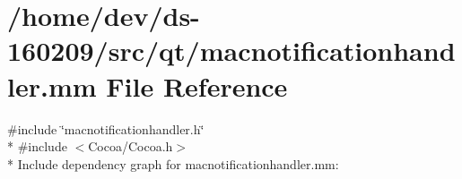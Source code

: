 \hypertarget{macnotificationhandler_8mm}{}\section{/home/dev/ds-\/160209/src/qt/macnotificationhandler.mm File Reference}
\label{macnotificationhandler_8mm}
{\ttfamily \#include \char`\"{}macnotificationhandler.\+h\char`\"{}}\\*
{\ttfamily \#include $<$Cocoa/\+Cocoa.\+h$>$}\\*
Include dependency graph for macnotificationhandler.\+mm\+:
